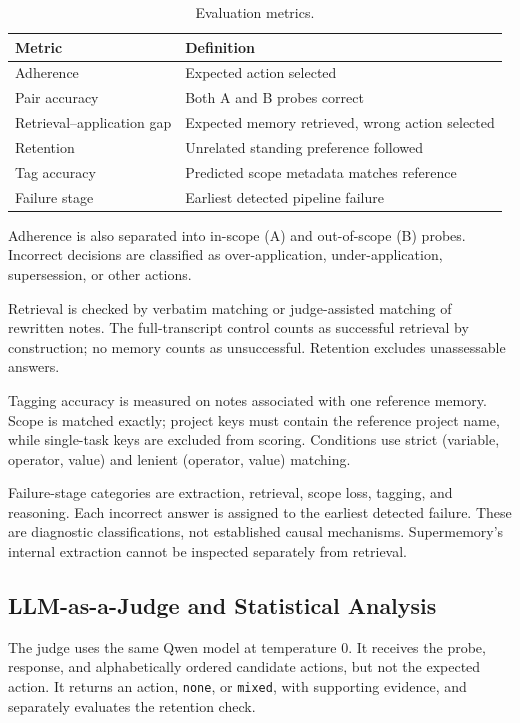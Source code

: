 \documentclass[11pt,a4paper]{article}
\begin{document}
\begin{table}[htbp]
\centering
\small
\caption{Evaluation metrics.}
\label{tab:metrics}
\begin{tabularx}{\linewidth}{lX}
\toprule
Metric & Definition \\
\midrule
Adherence & Expected action selected \\
Pair accuracy & Both A and B probes correct \\
Retrieval--application gap &
Expected memory retrieved, wrong action selected \\
Retention & Unrelated standing preference followed \\
Tag accuracy & Predicted scope metadata matches reference \\
Failure stage & Earliest detected pipeline failure \\
\bottomrule
\end{tabularx}
\end{table}

Adherence is also separated into in-scope (A) and
out-of-scope (B) probes. Incorrect decisions are
classified as over-application, under-application,
supersession, or other actions.

Retrieval is checked by verbatim matching or
judge-assisted matching of rewritten notes. The
full-transcript control counts as successful retrieval
by construction; no memory counts as unsuccessful.
Retention excludes unassessable answers.

Tagging accuracy is measured on notes associated with
one reference memory. Scope is matched exactly;
project keys must contain the reference project name,
while single-task keys are excluded from scoring.
Conditions use strict (variable, operator, value)
and lenient (operator, value) matching.

Failure-stage categories are extraction, retrieval,
scope loss, tagging, and reasoning. Each incorrect
answer is assigned to the earliest detected failure.
These are diagnostic classifications, not established
causal mechanisms. Supermemory's internal extraction
cannot be inspected separately from retrieval.

\subsection{LLM-as-a-Judge and Statistical Analysis}
\label{sec:judge}

The judge uses the same Qwen model at temperature 0.
It receives the probe, response, and alphabetically
ordered candidate actions, but not the expected action.
It returns an action, \texttt{none}, or \texttt{mixed},
with supporting evidence, and separately evaluates
the retention check.
\end{document}

